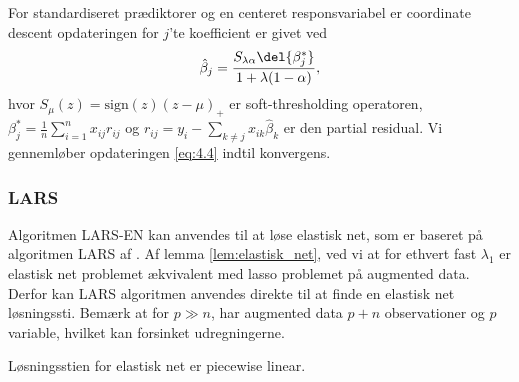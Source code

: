 For standardiseret prædiktorer og en centeret responsvariabel er coordinate descent opdateringen for $j$'te koefficient er givet ved
\begin{align}
\hat{\beta}_j = \frac{S_{\lambda \alpha} \del{\beta_j^*}}{1 + \lambda (1-\alpha)}, \label{eq:4.4}
\end{align}
hvor $S_\mu(z)=\text{sign}(z)(z-\mu)_+$ er soft-thresholding operatoren, \(\beta_j^* = \frac{1}{n} \sum_{i=1}^n x_{ij} r_{ij}\) og $r_{ij}=y_i - \sum_{k \neq j} x_{ik} \hat{\beta}_k$ er den partial residual. 
Vi gennemløber opdateringen \eqref{eq:4.4} indtil konvergens.

%


\subsubsection{LARS}
Algoritmen LARS-EN kan anvendes til at løse elastisk net, som er baseret på algoritmen LARS af \cite{efron}.
Af lemma \ref{lem:elastisk_net}, ved vi at for ethvert fast \(\lambda_1\) er elastisk net problemet ækvivalent med lasso problemet på augmented data.
Derfor kan LARS algoritmen anvendes direkte til at finde en elastisk net løsningssti.
Bemærk at for \(p \gg n\), har augmented data \(p+n\) observationer og \(p\) variable, hvilket kan forsinket udregningerne.


Løsningsstien for elastisk net er piecewise linear.
\newpage
